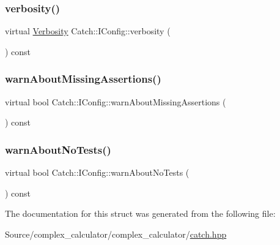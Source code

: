 \mbox{\label{struct_catch_1_1_i_config_a55aff5924bdbb3f558775821b1eb4b3d}} 
\subsubsection{\texorpdfstring{verbosity()}{verbosity()}}
{\footnotesize\ttfamily virtual \mbox{\hyperlink{namespace_catch_af85c0d46dfe687d923a157362fd07737}{Verbosity}} Catch\+::\+I\+Config\+::verbosity (\begin{DoxyParamCaption}{ }\end{DoxyParamCaption}) const\hspace{0.3cm}{\ttfamily [pure virtual]}}

\mbox{\label{struct_catch_1_1_i_config_a75d970c495a28e46b8e9b04a1d32149f}} 
\subsubsection{\texorpdfstring{warn\+About\+Missing\+Assertions()}{warnAboutMissingAssertions()}}
{\footnotesize\ttfamily virtual bool Catch\+::\+I\+Config\+::warn\+About\+Missing\+Assertions (\begin{DoxyParamCaption}{ }\end{DoxyParamCaption}) const\hspace{0.3cm}{\ttfamily [pure virtual]}}

\mbox{\label{struct_catch_1_1_i_config_a30590623e3918825f2896c2262bf6fe3}} 
\subsubsection{\texorpdfstring{warn\+About\+No\+Tests()}{warnAboutNoTests()}}
{\footnotesize\ttfamily virtual bool Catch\+::\+I\+Config\+::warn\+About\+No\+Tests (\begin{DoxyParamCaption}{ }\end{DoxyParamCaption}) const\hspace{0.3cm}{\ttfamily [pure virtual]}}



The documentation for this struct was generated from the following file\+:\begin{DoxyCompactItemize}
\item 
Source/complex\+\_\+calculator/complex\+\_\+calculator/\mbox{\hyperlink{catch_8hpp}{catch.\+hpp}}\end{DoxyCompactItemize}
